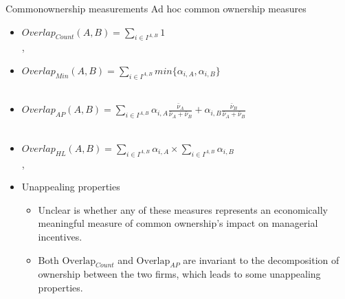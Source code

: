\documentclass[handout]{beamer}
\begin{document}
	\normalsize
	
	\begin{frame}{Commonownership measurements}{ Ad hoc common ownership measures}
		
		\begin{itemize}
			\item \color{cyan} \small $   Overlap_{Count}(A,B)= \sum_{i\in I^{A,B}} 1 $  \normalcolor\\
			\tiny  \cite{he2017product},\cite{he2019internalizing}  \\ 
			
			\normalsize
			\item \color{cyan} \small $   Overlap_{Min}(A,B)= \sum_{i\in I^{A,B}} min\{\alpha_{i,A},\alpha_{i,B}\} $  \normalcolor\\
			\tiny \cite{newham2018common}  \\ 
			
			\normalsize
			\item \color{cyan} \small $   Overlap_{AP}(A,B)= \sum_{i\in I^{A,B}} \alpha_{i,A}\frac{\bar{\nu}_A}{\bar{\nu}_A +\bar{\nu}_B } + \alpha_{i,B}\frac{\bar{\nu}_B}{\bar{\nu}_A +\bar{\nu}_B } $  \normalcolor\\
			\tiny \cite{AntonPolk} \\ 
			
			\normalsize
			\item \color{cyan} \small $   Overlap_{HL}(A,B)= \sum_{i\in I^{A,B}} \alpha_{i,A} \times \sum_{i\in I^{A,B}} \alpha_{i,B} $  \normalcolor\\
			\tiny \cite{hansen1996externalities} , \cite{freeman2019effects} \\ 
			\normalsize
			\item Unappealing properties
			\begin{itemize}
				\item  Unclear is whether any of these
				measures represents an economically meaningful measure
				of common ownership’s impact on managerial incentives.
				\item Both $  \text{Overlap}_{Count} $ and $  \text{Overlap}_{AP} $ are invariant
				to the decomposition of ownership between the two firms,
				which leads to some unappealing properties.
			\end{itemize}
		\end{itemize}
		
		\hfill
		\hyperlink{mainmeasure}{}
	\end{frame}
	
\end{document}
